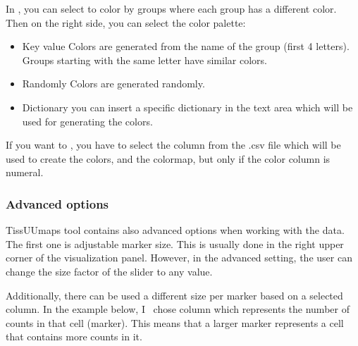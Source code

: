 \documentclass[letterpaper,10pt,english,openany,oneside]{sphinxmanual}
\begin{document}
\sphinxAtStartPar
{}

\sphinxAtStartPar
In , you can select to color by groups where each group has a different color. Then on the right side, you can select the color palette:
\begin{itemize}
\item {} 
\sphinxAtStartPar
Key value \sphinxhyphen{} Colors are generated from the name of the group (first 4 letters). Groups starting with the same letter have similar colors.

\item {} 
\sphinxAtStartPar
Randomly \sphinxhyphen{} Colors are generated randomly.

\item {} 
\sphinxAtStartPar
Dictionary \sphinxhyphen{} you can insert a specific dictionary in the text area which will be used for generating the colors.

\end{itemize}

\sphinxAtStartPar
{}

\sphinxAtStartPar
If you want to , you have to select the column from the .csv file which will be used to create the colors, and the colormap, but only if the color column is numeral.

\sphinxAtStartPar
{}


\subsubsection{Advanced options}
\label{\detokenize{docs/starting/markers:advanced-options}}
\sphinxAtStartPar
TissUUmaps tool contains also advanced options when working with the data. The first one is adjustable marker size. This is usually done in the right upper corner of the visualization panel. However, in the advanced setting, the user can change the size factor of the slider to any value.

\sphinxAtStartPar
{}

\sphinxAtStartPar
Additionally, there can be used a different size per marker based on a selected column. In the example below, I  chose column  which represents the number of counts in that cell (marker). This means that a larger marker represents a cell that contains more counts in it.
\end{document}
